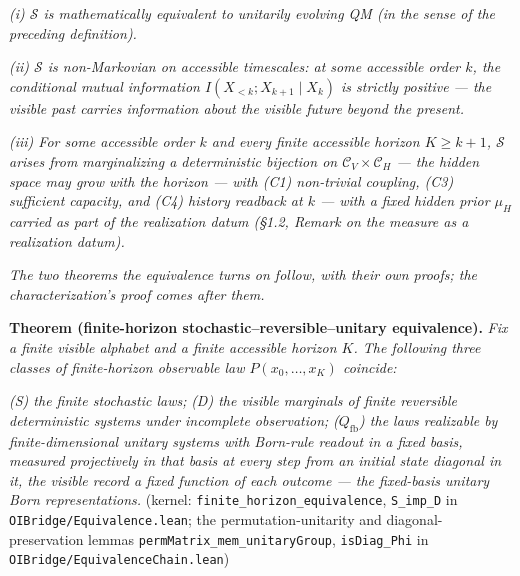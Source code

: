 \documentclass[
]{article}
\begin{document}
\emph{(i) \(\mathcal{S}\) is mathematically equivalent to unitarily
evolving QM (in the sense of the preceding definition).}

\emph{(ii) \(\mathcal{S}\) is non-Markovian on accessible timescales: at
some accessible order \(k\), the conditional mutual information
\(I(X_{<k}; X_{k+1} \mid X_k)\) is strictly positive --- the visible
past carries information about the visible future beyond the present.}

\emph{(iii) For some accessible order \(k\) and every finite accessible
horizon \(K \geq k+1\), \(\mathcal{S}\) arises from marginalizing a
deterministic bijection on \(\mathcal{C}_V \times \mathcal{C}_H\) ---
the hidden space may grow with the horizon --- with (C1) non-trivial
coupling, (C3) sufficient capacity, and (C4) history readback at \(k\)
--- with a fixed hidden prior \(\mu_H\) carried as part of the
realization datum (§1.2, Remark on the measure as a realization datum).}

\emph{The two theorems the equivalence turns on follow, with their own
proofs; the characterization's proof comes after them.}

\textbf{Theorem (finite-horizon stochastic--reversible--unitary
equivalence).} \emph{Fix a finite visible alphabet and a finite
accessible horizon \(K\). The following three classes of finite-horizon
observable law \(P(x_0, \ldots, x_K)\) coincide:}

\emph{(S) the finite stochastic laws;} \emph{(D) the visible marginals
of finite reversible deterministic systems under incomplete
observation;} \emph{(\(Q_{\mathrm{fb}}\)) the laws realizable by
finite-dimensional unitary systems with Born-rule readout in a fixed
basis, measured projectively in that basis at every step from an initial
state diagonal in it, the visible record a fixed function of each
outcome --- the fixed-basis unitary Born representations.} (kernel:
\texttt{finite\_horizon\_equivalence}, \texttt{S\_imp\_D} in
\texttt{OIBridge/Equivalence.lean}; the permutation-unitarity and
diagonal-preservation lemmas \texttt{permMatrix\_mem\_unitaryGroup},
\texttt{isDiag\_Phi} in \texttt{OIBridge/EquivalenceChain.lean})
\end{document}
